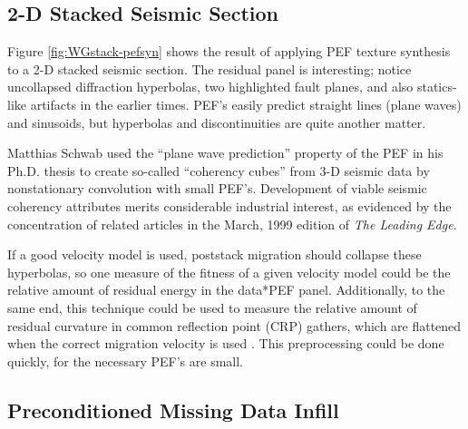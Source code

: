 	\subsection{ 2-D Stacked Seismic Section}

	Figure \ref{fig:WGstack-pefsyn} shows the result of applying PEF texture synthesis
	to a 2-D stacked seismic section.  The residual panel is interesting; notice 
	uncollapsed diffraction hyperbolas, two highlighted fault planes, and also statics-like
	artifacts in the earlier times.  PEF's easily predict straight lines
	(plane waves) and sinusoids, but hyperbolas and discontinuities are quite another matter.
	\par
	Matthias Schwab used the ``plane wave prediction'' property of the PEF in his Ph.D.
	thesis {\small \cite[]{Schwab.sepphd.99}} to create so-called ``coherency cubes'' from 
	3-D seismic data by nonstationary convolution with small PEF's.  Development of viable
	seismic coherency attributes merits considerable industrial interest, as evidenced by 
	the concentration of related articles in the March, 1999 edition of {\em The Leading Edge}. 
	\par
	If a good velocity model is used, poststack migration should collapse these hyperbolas, 
	so one measure of the fitness of a given velocity model could be the relative amount of 
	residual energy in the data*PEF panel.  
	Additionally, to the same end, this technique could be used to measure the relative amount 
	of residual curvature in common reflection point (CRP) gathers, which are flattened when 
	the correct migration velocity is used \cite[]{3dsi}.  This preprocessing could be done
	quickly, for the necessary PEF's are small.


	\subsection{ Preconditioned Missing Data Infill}


